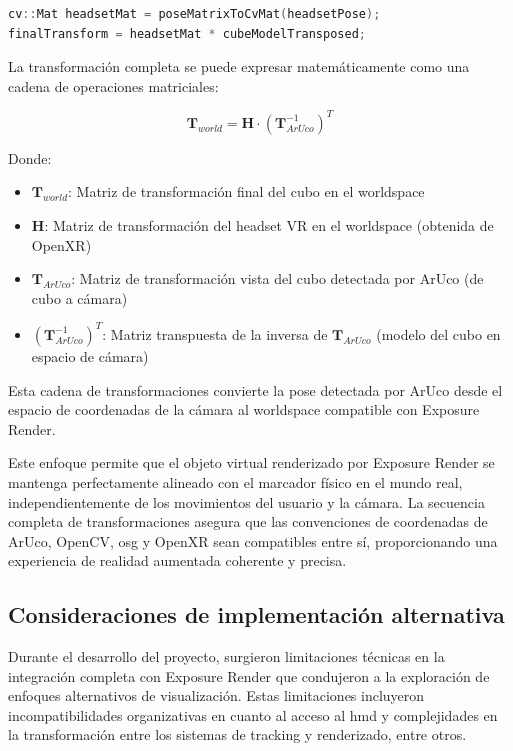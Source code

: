 \begin{lstlisting}[language=C++]
cv::Mat headsetMat = poseMatrixToCvMat(headsetPose);
finalTransform = headsetMat * cubeModelTransposed;
\end{lstlisting}

La transformación completa se puede expresar matemáticamente como una cadena de operaciones matriciales:

$$\mathbf{T}_{world} = \mathbf{H} \cdot (\mathbf{T}_{ArUco}^{-1})^T$$

Donde:
\begin{itemize}
    \item $\mathbf{T}_{world}$: Matriz de transformación final del cubo en el \gls{worldspace}
    \item $\mathbf{H}$: Matriz de transformación del headset VR en el \gls{worldspace} (obtenida de OpenXR)
    \item $\mathbf{T}_{ArUco}$: Matriz de transformación vista del cubo detectada por ArUco (de cubo a cámara)
    \item $(\mathbf{T}_{ArUco}^{-1})^T$: Matriz transpuesta de la inversa de $\mathbf{T}_{ArUco}$ (modelo del cubo en espacio de cámara)
\end{itemize}

Esta cadena de transformaciones convierte la pose detectada por ArUco desde el espacio de coordenadas de la cámara al \gls{worldspace} compatible con Exposure Render.

Este enfoque permite que el objeto virtual renderizado por Exposure Render se mantenga perfectamente alineado con el marcador físico en el mundo real, independientemente de los movimientos del usuario y la cámara. La secuencia completa de transformaciones asegura que las convenciones de coordenadas de ArUco, OpenCV, \acrshort{osg} y OpenXR sean compatibles entre sí, proporcionando una experiencia de realidad aumentada coherente y precisa.

\subsection{Consideraciones de implementación alternativa}

Durante el desarrollo del proyecto, surgieron limitaciones técnicas en la integración completa con Exposure Render que condujeron a la exploración de enfoques alternativos de visualización. Estas limitaciones incluyeron incompatibilidades organizativas en cuanto al acceso al \acrshort{hmd} y complejidades en la transformación entre los sistemas de \gls{tracking} y renderizado, entre otros.


